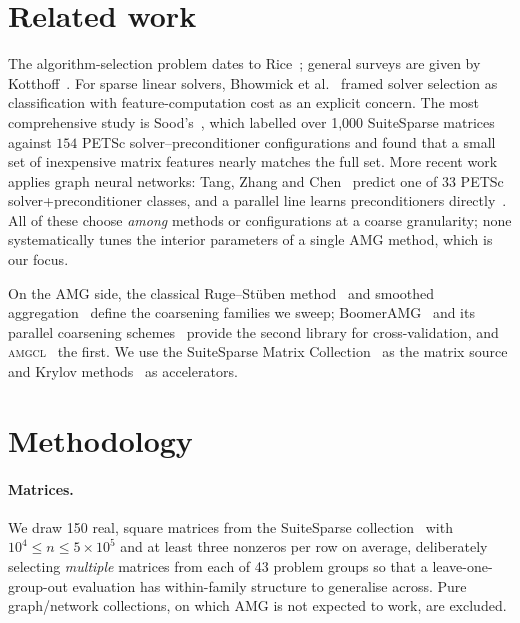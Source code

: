 \documentclass[11pt]{article}
\newcommand{\amgcl}{\textsc{amgcl}}
\begin{document}
\section{Related work}
\label{sec:related}

The algorithm-selection problem dates to Rice~\cite{rice1976}; general surveys
are given by Kotthoff~\cite{kotthoff2016}. For sparse linear solvers,
Bhowmick et al.~\cite{bhowmick2009} framed solver selection as classification
with feature-computation cost as an explicit concern. The most comprehensive
study is Sood's~\cite{sood2019}, which labelled over 1{,}000 SuiteSparse
matrices against $154$ PETSc solver--preconditioner configurations and found
that a small set of inexpensive matrix features nearly matches the full set.
More recent work applies graph neural networks: Tang, Zhang and
Chen~\cite{tang2022} predict one of 33 PETSc solver+preconditioner classes,
and a parallel line learns preconditioners directly~\cite{chen2024gnp,
hausner2025}. All of these choose \emph{among} methods or configurations at a
coarse granularity; none systematically tunes the interior parameters of a
single AMG method, which is our focus.

On the AMG side, the classical Ruge--St\"uben method~\cite{ruge1987} and
smoothed aggregation~\cite{vanek1996} define the coarsening families we sweep;
BoomerAMG~\cite{henson2002,hypre} and its parallel coarsening
schemes~\cite{desterck2006} provide the second library for cross-validation,
and \amgcl{}~\cite{amgcl} the first. We use the SuiteSparse Matrix
Collection~\cite{davis2011} as the matrix source and Krylov
methods~\cite{hestenes1952,saad1986,vandervorst1992,saad2003} as accelerators.

\section{Methodology}
\label{sec:method}

\paragraph{Matrices.}
We draw 150 real, square matrices from the SuiteSparse
collection~\cite{davis2011} with $10^4 \le n \le 5\times10^5$ and at least
three nonzeros per row on average, deliberately selecting \emph{multiple}
matrices from each of 43 problem groups so that a leave-one-group-out
evaluation has within-family structure to generalise across. Pure
graph/network collections, on which AMG is not expected to work, are excluded.
\end{document}
